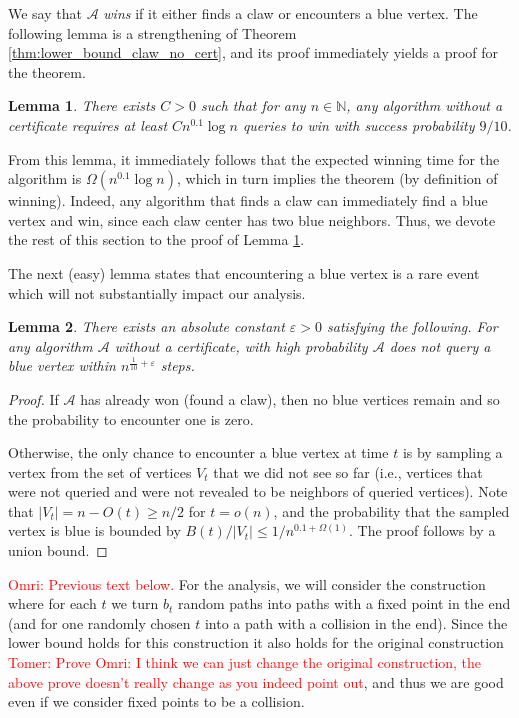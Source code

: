 \documentclass[11pt]{article}
\numberwithin{equation}{section}
\newtheorem{lemma}[lemma]{Lemma}
\newcommand{\N}{\mathbb N}
\newcommand{\eps}{\varepsilon}
\newcommand{\1}{\mathbf{1}}
\newcommand{\A}{\mathcal A}
\newcommand\omri[1]{{\textcolor{red}{Omri: #1}}}
\newcommand\tomer[1]{{\textcolor{red}{Tomer: #1}}}
\begin{document}
We say that $\A$ \emph{wins} if it either finds a claw or encounters a blue vertex. The following lemma is a strengthening of Theorem \ref{thm:lower_bound_claw_no_cert}, and its proof immediately yields a proof for the theorem. 
\begin{lemma}
\label{lem:winning}
There exists $C > 0$ such that for any $n \in \N$, any algorithm without a certificate requires at least $C n^{0.1} \log n$ queries to win with success probability $9/10$.
\end{lemma}
From this lemma, it immediately follows that the expected winning time for the algorithm is $\Omega(n^{0.1} \log n)$, which in turn implies the theorem (by definition of winning). Indeed, any algorithm that finds a claw can immediately find a blue vertex and win, since each claw center has two blue neighbors.
Thus, we devote the rest of this section to the proof of Lemma \ref{lem:winning}.

The next (easy) lemma states that encountering a blue vertex is a rare event which will not substantially impact our analysis.
\begin{lemma}
\label{lem:no_blue_vertices}
There exists an absolute constant $\eps > 0$ satisfying the following. For any algorithm $\A$ without a certificate, with high probability $\A$ does not query a blue vertex within $n^{\frac{1}{10} + \eps}$ steps.
\end{lemma}
\begin{proof}
If $\A$ has already won (found a claw), then no blue vertices remain and so the probability to encounter one is zero.

Otherwise, the only chance to encounter a blue vertex at time $t$ is by sampling a vertex from the set of vertices $V_t$ that we did not see so far (i.e., vertices that were not queried and were not revealed to be neighbors of queried vertices). Note that $|V_t| = n - O(t) \geq n/2$ for $t=o(n)$, and the probability that the sampled vertex is blue is bounded by $B(t) / |V_t| \leq 1 / n^{0.1+\Omega(1)}$. The proof follows by a union bound.
\end{proof}


\iffalse
\vspace{1cm}
\omri{Previous text below.}
For the analysis, we will consider the construction where for each $t$ we turn $b_t$ random paths into paths with a fixed point in the end (and for one randomly chosen $t$ into a path with a collision in the end). Since the lower bound holds for this construction it also holds for the original construction \tomer{Prove} \omri{I think we can just change the original construction, the above prove doesn't really change as you indeed point out}, and thus we are good even if we consider fixed points to be a collision.
\end{document}
